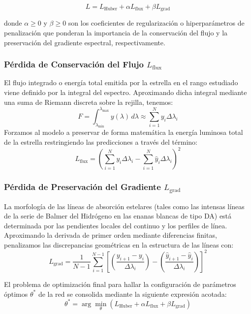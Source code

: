 \documentclass{article}
\begin{document}
\begin{equation}
L = L_{\mathrm{Huber}} + \alpha L_{\mathrm{flux}} + \beta L_{\mathrm{grad}}
\end{equation}

donde $\alpha \ge 0$ y $\beta \ge 0$ son los coeficientes de regularización o hiperparámetros de penalización que ponderan la importancia de la conservación del flujo y la preservación del gradiente espectral, respectivamente.

\subsubsection{Pérdida de Conservación del Flujo \texorpdfstring{$L_{\mathrm{flux}}$}{L flux}}
El flujo integrado o energía total emitida por la estrella en el rango estudiado viene definido por la integral del espectro. Aproximando dicha integral mediante una suma de Riemann discreta sobre la rejilla, tenemos:
\begin{equation}
F = \int_{\lambda_{\min}}^{\lambda_{\max}} y(\lambda)\,d\lambda \approx \sum_{i=1}^{N} y_i\Delta\lambda_i
\end{equation}
Forzamos al modelo a preservar de forma matemática la energía luminosa total de la estrella restringiendo las predicciones a través del término:
\begin{equation}
L_{\mathrm{flux}} = \left( \sum_{i=1}^{N} y_i\Delta\lambda_i - \sum_{i=1}^{N} \hat{y}_i\Delta\lambda_i \right)^2
\end{equation}

\subsubsection{Pérdida de Preservación del Gradiente \texorpdfstring{$L_{\mathrm{grad}}$}{L grad}}
La morfología de las líneas de absorción estelares (tales como las intensas líneas de la serie de Balmer del Hidrógeno en las enanas blancas de tipo DA) está determinada por las pendientes locales del continuo y los perfiles de línea. Aproximando la derivada de primer orden mediante diferencias finitas, penalizamos las discrepancias geométricas en la estructura de las líneas con:
\begin{equation}
L_{\mathrm{grad}} = \frac{1}{N-1} \sum_{i=1}^{N-1} \left[ \left( \frac{y_{i+1}-y_i}{\Delta\lambda_i} \right) - \left( \frac{\hat{y}_{i+1}-\hat{y}_i}{\Delta\lambda_i} \right) \right]^2
\end{equation}

El problema de optimización final para hallar la configuración de parámetros óptimos $\theta^*$ de la red se consolida mediante la siguiente expresión acotada:
\begin{equation}
\boxed{
\theta^{*} = \arg\min_{\theta} \left( L_{\mathrm{Huber}} + \alpha L_{\mathrm{flux}} + \beta L_{\mathrm{grad}} \right)
}
\end{equation}
\end{document}
